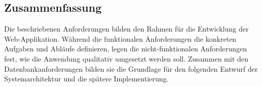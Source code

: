 \subsection{Zusammenfassung}
\label{subsec:zusammenfassung}

Die beschriebenen Anforderungen bilden den Rahmen für die Entwicklung der Web-Applikation.
Während die funktionalen Anforderungen die konkreten Aufgaben und Abläufe definieren,
legen die nicht-funktionalen Anforderungen fest, wie die Anwendung qualitativ umgesetzt werden soll.
Zusammen mit den Datenbankanforderungen bilden sie die Grundlage für den folgenden Entwurf der Systemarchitektur und die spätere Implementierung.

